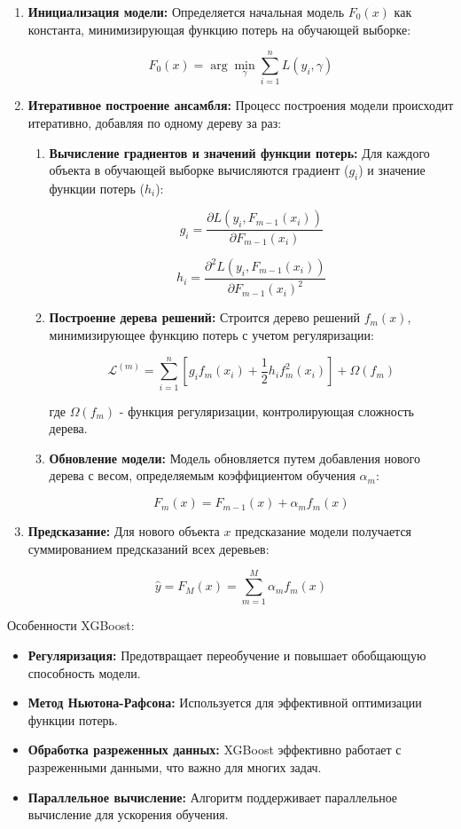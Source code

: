 \documentclass[12pt, a4paper]{extreport}
\begin{document}
\begin{enumerate}[label=\arabic*.]
\item \textbf{Инициализация модели:} 
  Определяется начальная модель $F_0(x)$ как константа, минимизирующая функцию потерь на обучающей выборке:

  $$F_0(x) = \arg \min_{\gamma} \sum_{i=1}^n L(y_i, \gamma)$$

\item \textbf{Итеративное построение ансамбля:} 
  Процесс построения модели происходит итеративно, добавляя по одному дереву за раз:
    \begin{enumerate}[label=\roman*.]
        \item \textbf{Вычисление градиентов и значений функции потерь:} Для каждого объекта в обучающей выборке вычисляются градиент ($g_i$) и значение функции потерь ($h_i$):

            $$g_i = \frac{\partial L(y_i, F_{m-1}(x_i))}{\partial F_{m-1}(x_i)}$$

            $$h_i = \frac{\partial^2 L(y_i, F_{m-1}(x_i))}{\partial F_{m-1}(x_i)^2}$$

        \item \textbf{Построение дерева решений:} Строится дерево решений $f_m(x)$, минимизирующее функцию потерь с учетом регуляризации:

            $$\mathcal{L}^{(m)} = \sum_{i=1}^n \left[ g_i f_m(x_i) + \frac{1}{2} h_i f_m^2(x_i) \right] + \Omega(f_m)$$

            где $\Omega(f_m)$ - функция регуляризации, контролирующая сложность дерева.

        \item \textbf{Обновление модели:} Модель обновляется путем добавления нового дерева с весом, определяемым коэффициентом обучения $\alpha_m$:

            $$F_m(x) = F_{m-1}(x) + \alpha_m f_m(x)$$
    \end{enumerate}

\item \textbf{Предсказание:} 
  Для нового объекта $x$ предсказание модели получается суммированием предсказаний всех деревьев:

  $$\hat{y} = F_M(x) = \sum_{m=1}^M \alpha_m f_m(x)$$
\end{enumerate}

Особенности XGBoost:

\begin{itemize}
\item \textbf{Регуляризация:} Предотвращает переобучение и повышает обобщающую способность модели.
\item \textbf{Метод Ньютона-Рафсона:} Используется для эффективной оптимизации функции потерь.
\item \textbf{Обработка разреженных данных:} XGBoost эффективно работает с разреженными данными, что важно для многих задач.
\item \textbf{Параллельное вычисление:} Алгоритм поддерживает параллельное вычисление для ускорения обучения.
\end{itemize}
\end{document}
